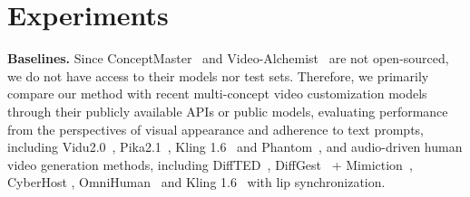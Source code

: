 \documentclass{article} %
\begin{document}
\section{Experiments}

\noindent \textbf{Baselines.} Since ConceptMaster~\citep{huang2025conceptmaster} and Video-Alchemist~\citep{chen2025multi} are not open-sourced, we do not have access to their models nor test sets. Therefore, we primarily compare our method with recent multi-concept video customization models through their publicly available APIs or public models, evaluating performance from the perspectives of visual appearance and adherence to text prompts, including Vidu2.0~\citep{bao2024vidu}, Pika2.1~\citep{pikaart2024}, Kling 1.6~\citep{kuaishou2024} and Phantom~\citep{liu2025phantom}, and audio-driven human video generation methods, including DiffTED~\citep{diffted}, DiffGest~\citep{zhu2023taming} + Mimiction~\citep{zhang2024mimicmotion}, CyberHost \citep{lin2024cyberhost}, OmniHuman~\citep{lin2025omnihuman} and Kling 1.6~\citep{kuaishou2024} with lip synchronization. 

\begin{table}
\caption{Quantitative comparisons with audio-conditioned full-body animation baselines.}
\centering
\label{tab:audio}
\vspace{-1em}
\end{table}
\end{document}
